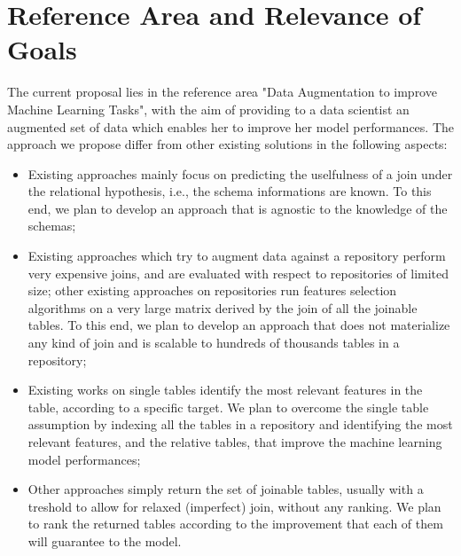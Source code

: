 \section{Reference Area and Relevance of Goals}\label{reference}
The current proposal lies in the reference area "Data Augmentation to improve Machine Learning Tasks", with the aim of providing to a data scientist an augmented set of data which enables her to improve her model performances. The approach we propose differ from other existing solutions in the following aspects:
\begin{itemize}
    \item Existing approaches mainly focus on predicting the uselfulness of a join under the relational hypothesis, i.e., the schema informations are known. To this end, we plan to develop an approach that is agnostic to the knowledge of the schemas;
    \item Existing approaches which try to augment data against a repository perform very expensive joins, and are evaluated with respect to repositories of limited size; other existing approaches on repositories run features selection algorithms on a very large matrix derived by the join of all the joinable tables. To this end, we plan to develop an approach that does not materialize any kind of join and is scalable to hundreds of thousands tables in a repository;
    \item Existing works on single tables identify the most relevant features in the table, according to a specific target. We plan to overcome the single table assumption by indexing all the tables in a repository and identifying the most relevant features, and the relative tables, that improve the machine learning model performances;
    \item Other approaches simply return the set of joinable tables, usually with a treshold to allow for relaxed  (imperfect) join, without any ranking. We plan to rank the returned tables according to the improvement that each of them will guarantee to the model.
\end{itemize}    